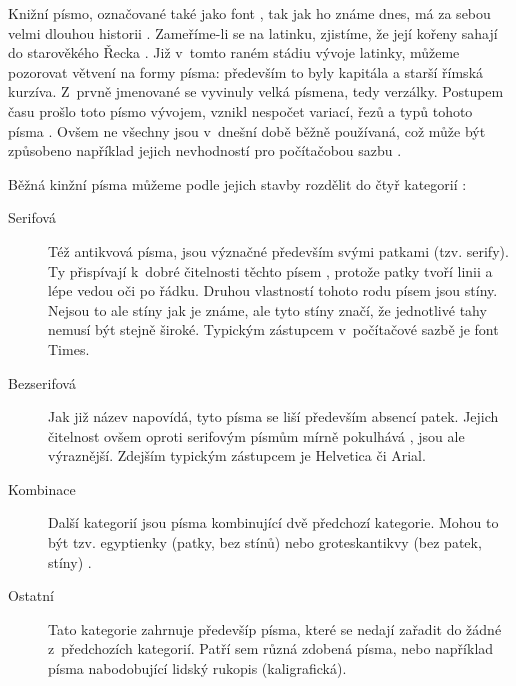 \documentclass[a4paper, 12pt]{article}[15.04.2012]
\begin{document}


Knižní písmo, označované také jako font \cite{software08}, tak jak ho známe dnes, má za sebou velmi
dlouhou historii \cite{mocicka05}. Zameříme-li se na latinku, zjistíme, že její kořeny sahají do
starověkého Řecka \cite{wiki-latinka}. Již v~tomto raném stádiu
vývoje latinky, můžeme pozorovat větvení na formy písma: především to byly kapitála a starší římská kurzíva.
Z~prvně jmenované se vyvinuly velká písmena, tedy verzálky. Postupem času prošlo toto písmo vývojem,
vznikl nespočet variací, řezů a typů tohoto písma \cite{computers05}. Ovšem ne všechny jsou v~dnešní době běžně používaná, což
může být způsobeno například jejich nevhodností pro počítačobou sazbu \cite{bednar11}\cite{zongker00}.

Běžná kinžní písma můžeme podle jejich stavby rozdělit do čtyř kategorií \cite{rybicka03}:
\begin{description}
  \item[Serifová] Též antikvová písma, jsou význačné především svými patkami (tzv. serify). Ty přispívají
  k~dobré čitelnosti těchto písem \cite{janak01}, protože patky tvoří linii a lépe vedou oči po řádku. Druhou vlastností
  tohoto rodu písem jsou stíny. Nejsou to ale stíny jak je známe, ale tyto stíny značí, že jednotlivé tahy
  nemusí být stejně široké. Typickým zástupcem v~počítačové sazbě je font Times.
  \item[Bezserifová] Jak již název napovídá, tyto písma se liší především absencí patek. Jejich čitelnost
  ovšem oproti serifovým písmům mírně pokulhává \cite{goossens94}, jsou ale výraznější. Zdejším typickým zástupcem je
  Helvetica či Arial.
  \item[Kombinace] Další kategorií jsou písma kombinující dvě předchozí kategorie. Mohou to být tzv. egyptienky (patky, bez stínů)
  nebo groteskantikvy (bez patek, stíny) \cite{antypa-pismo}.
  \item[Ostatní] Tato kategorie zahrnuje předevšíp písma, které se nedají zařadit do žádné z~předchozích kategorií.
  Patří sem různá zdobená písma, nebo například písma nabodobující lidský rukopis (kaligrafická).
\end{description}



\end{document}
